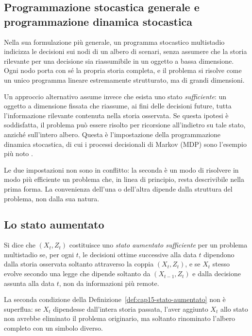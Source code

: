 \subsection{Programmazione stocastica generale e programmazione dinamica
stocastica}

Nella sua formulazione pi\`u generale, un programma stocastico multistadio
indicizza le decisioni sui nodi di un albero di scenari, senza assumere che
la storia rilevante per una decisione sia riassumibile in un oggetto a
bassa dimensione. Ogni nodo porta con s\'e la propria storia completa, e il
problema si risolve come un unico programma lineare estremamente
strutturato, ma di grandi dimensioni.

Un approccio alternativo assume invece che esista uno stato
\emph{sufficiente}: un oggetto a dimensione fissata che riassume, ai fini
delle decisioni future, tutta l'informazione rilevante contenuta nella
storia osservata. Se questa ipotesi \`e soddisfatta, il problema pu\`o
essere risolto per ricorsione all'indietro su tale stato, anzich\'e
sull'intero albero. Questa \`e l'impostazione della programmazione dinamica
stocastica, di cui i processi decisionali di Markov (MDP) sono
l'esempio pi\`u noto \cite{BirgeLouveaux}.

Le due impostazioni non sono in conflitto: la seconda \`e un modo di
risolvere in modo pi\`u efficiente un problema che, in linea di principio,
resta descrivibile nella prima forma. La convenienza dell'una o dell'altra
dipende dalla struttura del problema, non dalla sua natura.

\subsection{Lo stato aumentato}

\begin{definition}

\label{def:cap15-stato-aumentato}

Si dice che $(X_t,Z_t)$ costituisce uno \emph{stato aumentato sufficiente}
per un problema multistadio se, per ogni $t$, le decisioni ottime successive
alla data $t$ dipendono dalla storia osservata soltanto attraverso la
coppia $(X_t,Z_t)$, e se $X_t$ stesso evolve secondo una legge che dipende
soltanto da $(X_{t-1},Z_t)$ e dalla decisione assunta alla data $t$, non da
informazioni pi\`u remote.

\end{definition}

La seconda condizione della Definizione~\ref{def:cap15-stato-aumentato} non
\`e superflua: se $X_t$ dipendesse dall'intera storia passata, l'aver
aggiunto $X_t$ allo stato non avrebbe eliminato il problema originario, ma
soltanto rinominato l'albero completo con un simbolo diverso.

